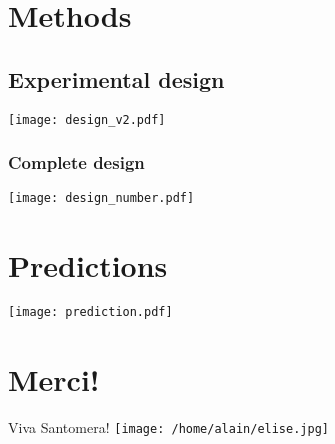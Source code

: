 \documentclass{beamer}[12pt]
\begin{document}
\section{Methods}

\subsection{Experimental design}

\begin{frame}
	\texttt{[image: design\_v2.pdf]}
\end{frame}

\begin{frame}\frametitle{Complete design}
	\texttt{[image: design\_number.pdf]}
\end{frame}

\section{Predictions}

\begin{frame}
	\begin{center}
	\texttt{[image: prediction.pdf]}
	\end{center}
\end{frame}

\section{Merci!}
\begin{frame}
	\begin{center}
		Viva Santomera!
		\texttt{[image: /home/alain/elise.jpg]}

	\end{center}
\end{frame}
\end{document}
